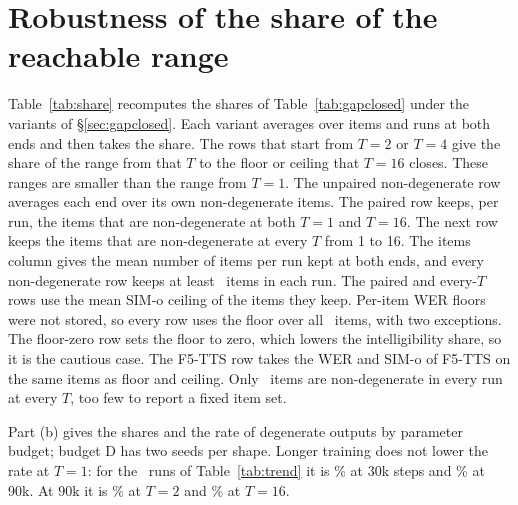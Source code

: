 \section{Robustness of the share of the reachable range}
\label{app:share}
Table~\ref{tab:share} recomputes the shares of Table~\ref{tab:gapclosed} under the variants
of \S\ref{sec:gapclosed}. Each variant averages over items and runs at both ends and then
takes the share. The rows that start from $T{=}2$ or $T{=}4$ give the share of the range from
that $T$ to the floor or ceiling that $T{=}16$ closes. These ranges are smaller than the range
from $T{=}1$. The unpaired non-degenerate row averages each end over its own non-degenerate
items. The paired row keeps, per run, the items that are non-degenerate at both $T{=}1$ and
$T{=}16$. The next row keeps the items that are non-degenerate at every $T$ from 1 to 16.
The items column gives the mean number of items per run kept at both ends, and every
non-degenerate row keeps at least \NcrsNdMinItems\ items in each run. The paired and
every-$T$ rows use the mean SIM-o ceiling of the items they keep. Per-item WER floors were
not stored, so every row uses the floor over all \Nitems\ items, with two exceptions. The
floor-zero row sets the floor to zero, which lowers the intelligibility share, so it is the
cautious case. The F5-TTS row takes the WER and SIM-o of F5-TTS on the same items as floor
and ceiling. Only \NcrsFixedItems\ items are non-degenerate in every run at every $T$, too
few to report a fixed item set.

Part (b) gives the shares and the rate of degenerate outputs by parameter budget; budget D
has two seeds per shape. Longer training does not lower the rate at $T{=}1$: for the
\NtrendRuns\ runs of Table~\ref{tab:trend} it is \NcrsDegenThirtykTOne\% at 30k steps and
\NcrsDegenNinetykTOne\% at 90k. At 90k it is \NcrsDegenNinetykTTwo\% at $T{=}2$ and
\NcrsDegenNinetykTSixteen\% at $T{=}16$.

